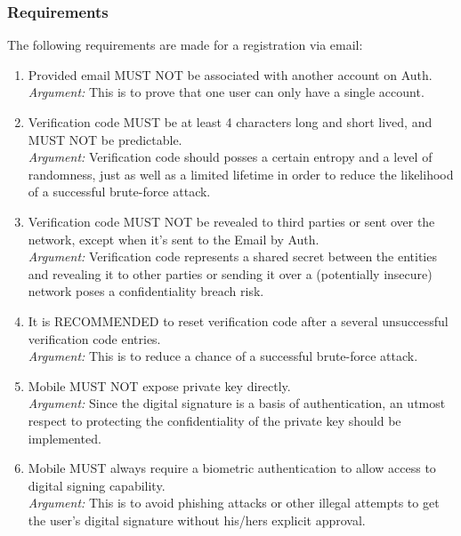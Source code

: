         \subsubsection{Requirements}
        The following requirements are made for a registration via email:
            \begin{enumerate}
                \item Provided email MUST NOT be associated with another account on Auth.\\
                \textit{Argument:} This is to prove that one user can only have a single account.

                \item Verification code MUST be at least 4 characters long and short lived, and MUST NOT be 
                    predictable.\\        
                \textit{Argument:} Verification code should posses a certain entropy and a level of randomness, 
                                just as well as a limited lifetime in order to reduce the likelihood of a 
                                successful brute-force attack.

                \item Verification code MUST NOT be revealed to third parties or sent over the network, except when
                    it's sent to the Email by Auth.\\        
                \textit{Argument:} Verification code represents a shared secret between the entities and revealing 
                                it to other parties or sending it over a (potentially insecure) network poses 
                                a confidentiality breach risk. 

                \item It is RECOMMENDED to reset verification code after a several unsuccessful verification 
                    code entries.\\        
                \textit{Argument:} This is to reduce a chance of a successful brute-force attack.

                \item Mobile MUST NOT expose private key directly.\\
                \textit{Argument:} Since the digital signature is a basis of authentication, an utmost respect to 
                                protecting the confidentiality of the private key should be implemented.

                \item Mobile MUST always require a biometric authentication to allow access to digital signing 
                    capability.\\        
                \textit{Argument:} This is to avoid phishing attacks or other illegal attempts to get the user's 
                                digital signature without his/hers explicit approval.


\end{enumerate}
